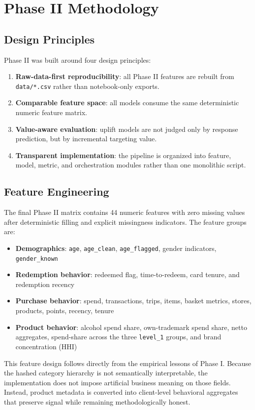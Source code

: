 \documentclass[11pt,a4paper]{article}
\begin{document}
\section{Phase II Methodology}
\subsection{Design Principles}
Phase II was built around four design principles:
\begin{enumerate}
    \item \textbf{Raw-data-first reproducibility}: all Phase II features are rebuilt from \texttt{data/*.csv} rather than notebook-only exports.
    \item \textbf{Comparable feature space}: all models consume the same deterministic numeric feature matrix.
    \item \textbf{Value-aware evaluation}: uplift models are not judged only by response prediction, but by incremental targeting value.
    \item \textbf{Transparent implementation}: the pipeline is organized into feature, model, metric, and orchestration modules rather than one monolithic script.
\end{enumerate}

\subsection{Feature Engineering}
The final Phase II matrix contains 44 numeric features with zero missing values after deterministic filling and explicit missingness indicators. The feature groups are:
\begin{itemize}
    \item \textbf{Demographics}: \texttt{age}, \texttt{age\_clean}, \texttt{age\_flagged}, gender indicators, \texttt{gender\_known}
    \item \textbf{Redemption behavior}: redeemed flag, time-to-redeem, card tenure, and redemption recency
    \item \textbf{Purchase behavior}: spend, transactions, trips, items, basket metrics, stores, products, points, recency, tenure
    \item \textbf{Product behavior}: alcohol spend share, own-trademark spend share, netto aggregates, spend-share across the three \texttt{level\_1} groups, and brand concentration (HHI)
\end{itemize}

This feature design follows directly from the empirical lessons of Phase I. Because the hashed category hierarchy is not semantically interpretable, the implementation does not impose artificial business meaning on those fields. Instead, product metadata is converted into client-level behavioral aggregates that preserve signal while remaining methodologically honest.
\end{document}
